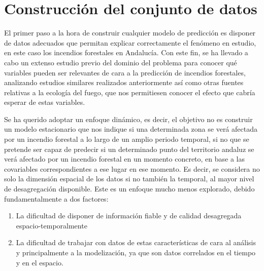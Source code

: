 \documentclass[12pt,a4paper,]{book}
\def\ifdoblecara{} %
\providecommand{\tightlist}{%
  \setlength{\itemsep}{0pt}\setlength{\parskip}{0pt}}
\numberwithin{dummy}{section}
\theoremstyle{ocrenumbox}
\theoremstyle{blacknumex}
\theoremstyle{blacknumbox}
\theoremstyle{ocrenum}
\theoremstyle{ocrenum}
\begin{document}
\ifdefined\ifdoblecara
\fancyhead{}{}
\fancyhead[LE,RO]{\scriptsize\rightmark}
\fancyfoot[LO,RE]{\scriptsize\slshape \leftmark}
\fancyfoot[C]{}
\fancyfoot[LE,RO]{\footnotesize\thepage}
\else
\fancyhead{}{}
\fancyhead[RO]{\scriptsize\rightmark}
\fancyfoot[LO]{\scriptsize\slshape \leftmark}
\fancyfoot[C]{}
\fancyfoot[RO]{\footnotesize\thepage}
\fi

\renewcommand{\headrulewidth}{0.4pt}
\renewcommand{\footrulewidth}{0.4pt}

\hypertarget{construcciuxf3n-del-conjunto-de-datos}{%
\chapter{Construcción del conjunto de
datos}\label{construcciuxf3n-del-conjunto-de-datos}}

El primer paso a la hora de construir cualquier modelo de predicción es
disponer de datos adecuados que permitan explicar correctamente el
fenómeno en estudio, en este caso los incendios forestales en Andalucía.
Con este fin, se ha llevado a cabo un extenso estudio previo del dominio
del problema para conocer qué variables pueden ser relevantes de cara a
la predicción de incendios forestales, analizando estudios similares
realizados anteriormente así como otras fuentes relativas a la ecología
del fuego, que nos permitiesen conocer el efecto que cabría esperar de
estas variables.

Se ha querido adoptar un enfoque dinámico, es decir, el objetivo no es
construir un modelo estacionario que nos indique si una determinada zona
se verá afectada por un incendio forestal a lo largo de un amplio
periodo temporal, si no que se pretende ser capaz de predecir si un
determinado punto del territorio andaluz se verá afectado por un
incendio forestal en un momento concreto, en base a las covariables
correspondientes a ese lugar en ese momento. Es decir, se considera no
solo la dimensión espacial de los datos si no también la temporal, al
mayor nivel de desagregación disponible. Este es un enfoque mucho menos
explorado, debido fundamentalmente a dos factores:

\begin{enumerate}
\def\labelenumi{\arabic{enumi}.}
\tightlist
\item
  La dificultad de disponer de información fiable y de calidad
  desagregada espacio-temporalmente
\item
  La dificultad de trabajar con datos de estas características de cara
  al análisis y principalmente a la modelización, ya que son datos
  correlados en el tiempo y en el espacio.
\end{enumerate}
\end{document}
